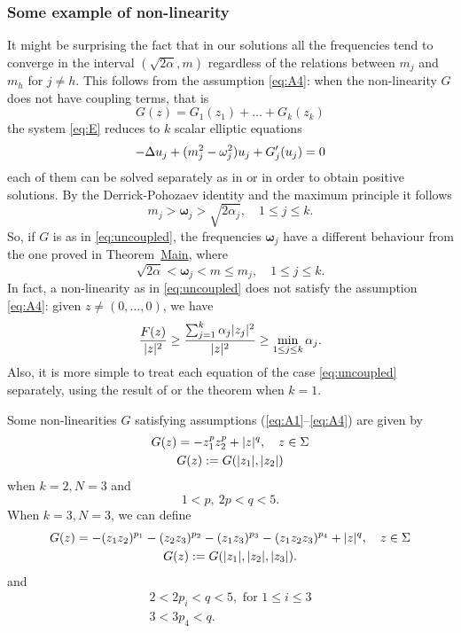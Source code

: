 \documentclass[a4paper,12pt,oneside]{amsart}
\theoremstyle{definition}
\theoremstyle{remark}
\theoremstyle{theorem}
\begin{document}
\subsubsection*{Some example of non-linearity}
It might be surprising the fact that in our solutions
all the frequencies tend to converge in the interval $ (\sqrt{2\alpha},m) $
regardless of the relations between $ m_j $ and $ m_h $ for $ j\neq h $.
This follows from the assumption \eqref{eq:A4}: when the non-linearity
$ {G} $ does not have coupling terms, that is
\begin{equation}
\label{eq:uncoupled}
{G}({z}) = {G}_1 ({z}_1) + \dots + {G}_k ({z}_k)
\end{equation}
the system \eqref{eq:E} reduces to $ k $ scalar elliptic equations
\[
-\Delta u_j + (m_j\sp 2 - {\mathbf{\omega}}_j\sp 2) u_j + {G}_j '(u_j) = 0
\]
each of them can be solved separately as in \cite{BF09} or \cite{BBBM10}
in order to obtain positive solutions. By the Derrick-Pohozaev identity and 
the maximum principle it follows
\[
m_j > {\mathbf{\omega}}_j > \sqrt{2\alpha_j},\quad 1\leq j\leq k.
\]
So, if $ {G} $ is as in \eqref{eq:uncoupled}, the frequencies $ {\mathbf{\omega}}_j $
have a different behaviour from the one proved in 
Theorem~\hyperlink{thm:main}{Main}, where
\[
\sqrt{2\alpha} < {\mathbf{\omega}}_j < m \leq m_j,\quad 1\leq j\leq k.
\]
In fact, a non-linearity as in \eqref{eq:uncoupled} does not satisfy the 
assumption \eqref{eq:A4}: given $ {z}\neq (0,\dots,0) $, we have
\[
\frac{{F}({z})}{|{z}|\sp 2}\geq\frac{\sum_{j = 1}\sp k \alpha_j |{z}_j|\sp 2}{|{z}|\sp 2}\geq\min_{1\leq j\leq k} \alpha_j.
\]
Also, it is more simple to treat each equation of 
the case \eqref{eq:uncoupled} separately, using the result of \cite{BBBM10}
or the theorem when $ k = 1 $.

Some non-linearities $ {G} $ satisfying assumptions (\ref{eq:A1}--\ref{eq:A4})
are given by
\begin{gather*}
{G}({z}) = - {z}_1 \sp p {z}_2 \sp p + |{z}|\sp q,\quad {z}\in\Sigma\\
{G}({z}) := {G}(|{z}_1|,|{z}_2|)
\end{gather*}
when $ k = 2,N = 3 $ and 
\[
1 < p,\ 2p < q < 5.
\]
When $ k = 3,N = 3 $, we can define
\begin{gather*}
{G}({z}) = - ({z}_1 {z}_2)\sp{p_1} - ({z}_2 {z}_3)\sp{p_2}
- ({z}_1 {z}_3)\sp{p_3} 
- ({z}_1 {z}_2 {z}_3)\sp{p_4} + |{z}|\sp q,\quad {z}\in\Sigma\\
{G}({z}) := {G}(|{z}_1|,|{z}_2|,|{z}_3|).
\end{gather*}
and
\begin{gather*}
2 < 2p_i < q < 5,\text{ for } 1\leq i\leq 3\\
3 < 3p_4 < q.
\end{gather*}
\end{document}
